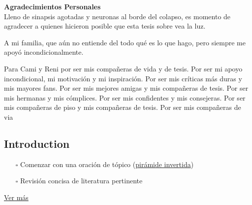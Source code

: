 \documentclass[
]{article}
\providecommand{\tightlist}{%
  \setlength{\itemsep}{0pt}\setlength{\parskip}{0pt}}\usepackage{longtable,booktabs,array}
\renewcommand*\contentsname{Table of contents}
\newcommand\contentsname{Table of contents}
\begin{document}
\newpage
    \begin{center}
        {\large \textbf{Agradecimientos Personales}}\\[0.3cm]
        Lleno de sinapsis agotadas y neuronas al borde del colapso, es momento de agradecer a quienes hicieron posible que esta tesis sobre vea la luz.

        A mi familia, que aún no entiende del todo qué es lo que hago, pero siempre me apoyó incondicionalmente. 

    \end{center}

\newpage
    \begin{center}
        Para Cami y Reni por ser mis compañeras de vida y de tesis. Por ser mi apoyo incondicional, mi motivación y mi inspiración. Por ser mis críticas más duras y mis mayores fans. Por ser mis mejores amigas y mis compañeras de tesis. Por ser mis hermanas y mis cómplices. Por ser mis confidentes y mis consejeras. Por ser mis compañeras de piso y mis compañeras de tesis. Por ser mis compañeras de via
    \end{center}

\newpage
\begin{center}
\end{center}

\newpage



\newpage
\tableofcontents
\renewcommand*\contentsname{Table of contents}
{
\hypersetup{linkcolor=}
\setcounter{tocdepth}{3}
\tableofcontents
}
\subsection{Introduction}\label{sec-intro}

\begin{tcolorbox}[enhanced jigsaw, coltitle=black, arc=.35mm, toprule=.15mm, colback=white, leftrule=.75mm, bottomrule=.15mm, breakable, colbacktitle=quarto-callout-tip-color!10!white, rightrule=.15mm, title=\textcolor{quarto-callout-tip-color}{\faLightbulb}\hspace{0.5em}{Tip}, opacitybacktitle=0.6, colframe=quarto-callout-tip-color-frame, bottomtitle=1mm, toptitle=1mm, left=2mm, titlerule=0mm, opacityback=0]

\begin{itemize}
\tightlist
\item[$\square$]
  Comenzar con una oración de tópico
  (\href{https://en.wikipedia.org/wiki/Inverted_pyramid_(journalism)}{pirámide
  invertida})
\item[$\square$]
  Revisión concisa de literatura pertinente
\end{itemize}

\href{https://writingcenter.gmu.edu/writing-resources/imrad/imrad-reports-introductions}{Ver
más}

\end{tcolorbox}
\end{document}
